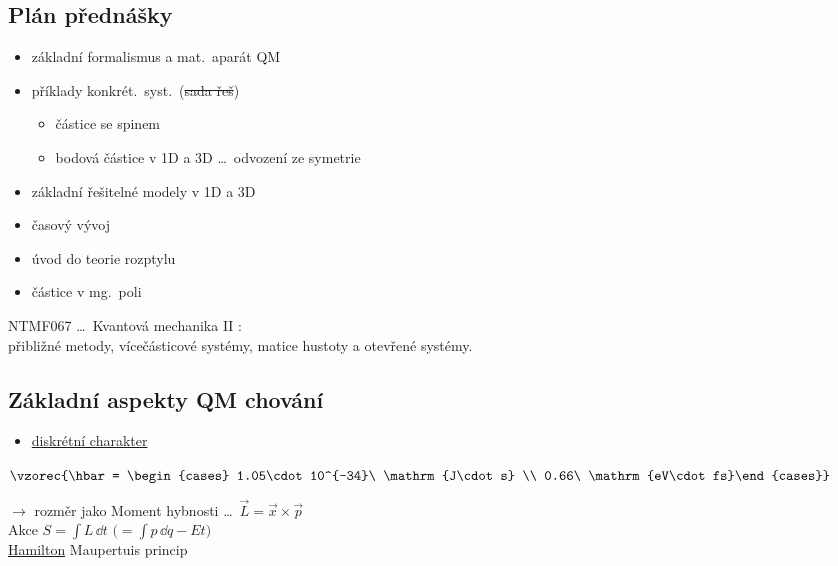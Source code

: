 \documentclass[11pt,a4paper]{article}
\begin{document}
\subsection*{Plán přednášky}
\begin{itemize}[nosep]
  \item základní formalismus a mat.\ aparát QM
  \item příklady konkrét.\ syst.\ (\sout{sada řeš})
  \begin{itemize}[nosep]
    \item částice se spinem
    \item bodová částice v 1D a 3D \dots\ odvození ze symetrie
  \end{itemize}
  \item základní řešitelné modely v 1D a 3D
  \item časový vývoj
  \item úvod do teorie rozptylu
  \item částice v mg.\ poli
\end{itemize}

NTMF067 \dots\ Kvantová mechanika II : \\
přibližné metody, vícečásticové systémy, matice hustoty a otevřené systémy.

\subsection*{Základní aspekty QM chování}
\begin{itemize}
  \item \underline{diskrétní charakter} 
\end{itemize}

 \quad
$\vzorec{\hbar = \begin{cases} 1.05\cdot 10^{-34}\ \mathrm{J\cdot s} \\ 0.66\ \mathrm{eV\cdot fs}\end{cases}}$

$\to$ rozměr jako \quad Moment hybnosti \dots\ $\vec{L} = \vec{x}\times\vec{p}$ \\
\phantom{$\to$ rozměr jako} \quad Akce \quad $S = \int L\,\dd t$ \quad $\big(= \int p\,\dd q - Et\big)$
 \\
\phantom{$\to$ rozměr jako \quad Akce} \quad \underline{Hamilton} \quad Maupertuis \quad princip
\end{document}
